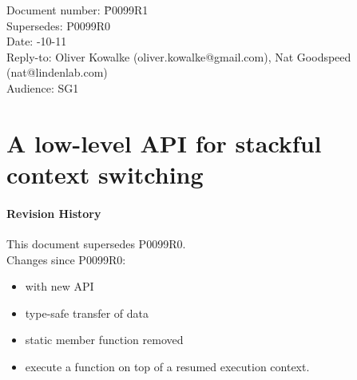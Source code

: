 \documentclass[paper=A4,pagesize,DIV=15]{scrartcl}
\begin{document}
\small
\begin{tabbing}
    Document number: \= P0099R1\\
    Supersedes:      \> P0099R0\\
    Date:            -10-11\\
    Reply-to:        \> Oliver Kowalke (oliver.kowalke@gmail.com), Nat Goodspeed (nat@lindenlab.com)\\
    Audience:        \> SG1\\
\end{tabbing}

\section*{A low-level API for stackful context switching}


\tableofcontents


\paragraph*{Revision History}
This document supersedes P0099R0.\\
\newline
Changes since P0099R0:

\begin{itemize}
    \item \ectx with new API
    \item type-safe transfer of data
    \item static member function  removed
    \item execute a function on top of a resumed execution context.
\end{itemize}












\end{document}
